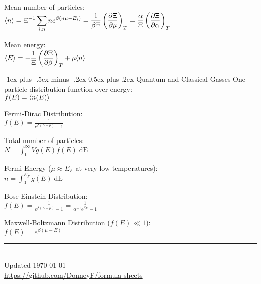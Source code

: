 \documentclass[12pt,landscape]{article}
\makeatletter
\renewcommand{\section}{\@startsection{section}{1}{0mm}%
                                {-1ex plus -.5ex minus -.2ex}%
                                {0.5ex plus .2ex}%
                                {\normalfont\normalsize\bfseries}}
\newcommand{\tab}{\hspace{.02\textwidth}}
\newcommand{\ds}{\displaystyle}
\makeatother
\begin{document}
\begin{multicols}{3}
Mean number of particles:\\
\tab $\ds \expval{n} = \Xi^{-1} \sum_{i,n}ne^{\beta(n\mu - E_i)} = \frac{1}{\beta\Xi}\left(\pdv{\Xi}{\mu}\right)_T =  \frac{\alpha}{\Xi}\left(\pdv{\Xi}{\alpha}\right)_T$

Mean energy:\\
\tab $\ds \expval{E} = -\frac{1}{\Xi}\left(\pdv{\Xi}{\beta}\right)_T + \mu\hspace{-0.75mm}\expval{n}$

\section{Quantum and Classical Gasses}
One-particle distribution function over energy:\\
\tab $f(E) = \expval{n(E)}$

Fermi-Dirac Distribution:\\
\tab $\ds f(E) = \frac{1}{e^{\beta(E - \mu)}- 1}$

Total number of particles:\\
\tab $\ds N = \int_{0}^{\infty}Vg(E)f(E)\mathop{dE}$

Fermi Energy ($\mu \approx E_F$ at very low temperatures):\\
\tab $\ds n = \int_{0}^{E_F}g(E)\mathop{dE}$

Bose-Einstein Distribution:\\
\tab $\ds f(E) = \frac{1}{e^{\beta(E - \mu)}-1} = \frac{1}{\alpha^{-1}e^{\beta E}-1}$

Maxwell-Boltzmann Distribution ($f(E) \ll 1$):\\
\tab $f(E) = e^{\beta(\mu - E)}$

\rule{0.3\linewidth}{0.25pt}
\scriptsize\\
Updated \today\\
\href{https://github.com/DonneyF/formula-sheets}{https://github.com/DonneyF/formula-sheets}
\end{multicols}
\end{document}
